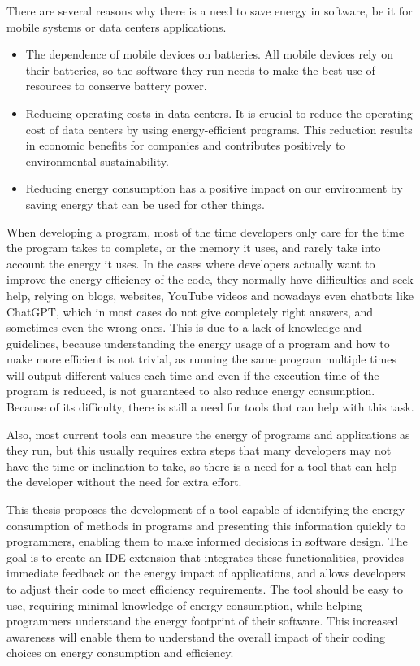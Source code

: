 \documentclass[sigplan]{acmart}
\begin{document}
There are several reasons why there is a need to save energy in software, be it for mobile systems or data centers applications. \\

\begin{itemize}
  \item The dependence of mobile devices on batteries. All mobile devices rely on their batteries, so the software they run needs to make the best use of resources to conserve battery power.
  \item Reducing operating costs in data centers. It is crucial to reduce the operating cost of data centers by using energy-efficient programs. This reduction results in economic benefits for companies and contributes positively to environmental sustainability. 
  \item Reducing energy consumption has a positive impact on our environment by saving energy that can be used for other things. \\
\end{itemize}

When developing a program, most of the time developers only care for the time the program takes to complete, or the memory it uses, and rarely take into account the energy it uses. 
In the cases where developers actually want to improve the energy efficiency of the code, they normally have difficulties and seek help, relying on blogs, websites, YouTube videos and nowadays even chatbots like ChatGPT, which in most cases do not give completely right answers, and sometimes even the wrong ones. This is due to a lack of knowledge and guidelines, because understanding the energy usage of a program and how to make more efficient is not trivial, as running the same program multiple times will output different values each time and even if the execution time of the program is reduced, is not guaranteed to also reduce energy consumption. Because of its difficulty, there is still a need for tools that can help with this task\cite{10.1145/2597073.2597110}. 

Also, most current tools can measure the energy of programs and applications as they run, but this usually requires extra steps that many developers may not have the time or inclination to take, so there is a need for a tool that can help the developer without the need for extra effort\cite{10.1145/3154384}.

This thesis proposes the development of a tool capable of identifying the energy consumption of methods in programs and presenting this information quickly to programmers, enabling them to make informed decisions in software design. The goal is to create an IDE extension that integrates these functionalities, provides immediate feedback on the energy impact of applications, and allows developers to adjust their code to meet efficiency requirements. The tool should be easy to use, requiring minimal knowledge of energy consumption, while helping programmers understand the energy footprint of their software. This increased awareness will enable them to understand the overall impact of their coding choices on energy consumption and efficiency.
\end{document}
